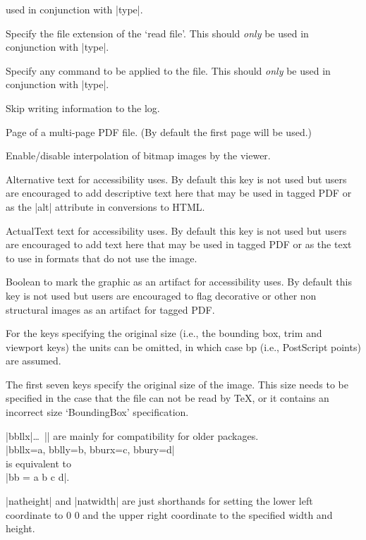\begin{description}
 used in conjunction with |type|.
\item[read] Specify the file extension of the `read file'. This
 should \emph{only} be used in conjunction with |type|.
\item[command] Specify any command to be applied to the file.  This
 should \emph{only} be used in conjunction with |type|.
\item[quiet]
 Skip writing information to the log.
\item[page]
Page of a multi-page PDF file. (By default the first page will be used.)
\item[interpolate]
Enable/disable interpolation of bitmap images by the viewer.
\item[alt]
  Alternative text for accessibility uses. By default this key is not used
  but users are encouraged to add descriptive text here that may be used in
  tagged PDF or as the |alt| attribute in conversions to HTML.
\item[actualtext]
  ActualText text for accessibility uses. By default this key is not used
  but users are encouraged to add text here that may be used in
  tagged PDF or as the text to use in formats that do not use the image.
\item[artifact]
  Boolean to mark the graphic as an artifact for accessibility uses. By default this key is not used
  but users are encouraged to flag decorative or other non structural images as an artifact for
  tagged PDF.
\end{description}

For the keys specifying the original size (i.e., the bounding box,
trim and viewport keys) the units can be omitted, in
which case bp (i.e., PostScript points) are assumed.

The first seven keys specify the original size of the image. This size
needs to be specified in the case that the file can not be read by
\TeX, or it contains an incorrect size `BoundingBox' specification.

|bbllx|\ldots\ |\bbury| are mainly for compatibility for older
packages.\\
|bbllx=a, bblly=b, bburx=c, bbury=d|\\
is equivalent to\\
|bb = a b c d|.

|natheight| and |natwidth| are just shorthands for setting the lower
left coordinate to 0 0 and the upper right coordinate to the specified
width and height.

